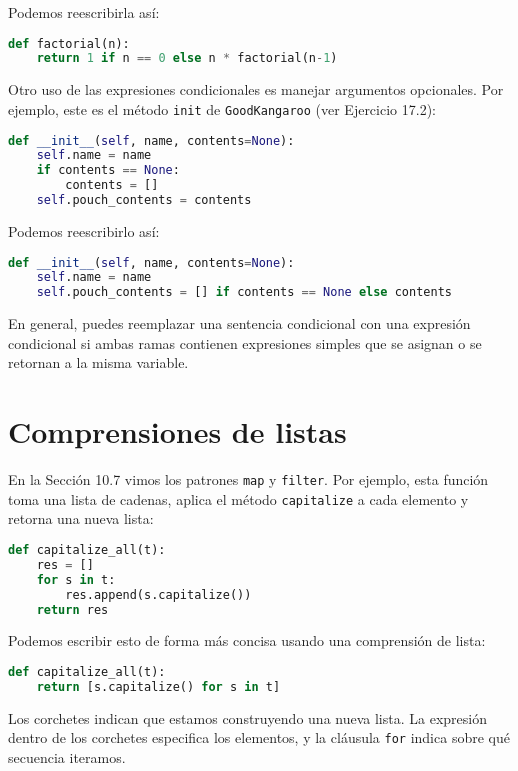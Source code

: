 Podemos reescribirla así:

\begin{lstlisting}[language=Python]
def factorial(n):
    return 1 if n == 0 else n * factorial(n-1)
\end{lstlisting}

Otro uso de las expresiones condicionales es manejar argumentos opcionales. Por ejemplo, este es el método \texttt{init} de \texttt{GoodKangaroo} (ver Ejercicio 17.2):

\begin{lstlisting}[language=Python]
def __init__(self, name, contents=None):
    self.name = name
    if contents == None:
        contents = []
    self.pouch_contents = contents
\end{lstlisting}

Podemos reescribirlo así:

\begin{lstlisting}[language=Python]
def __init__(self, name, contents=None):
    self.name = name
    self.pouch_contents = [] if contents == None else contents
\end{lstlisting}

En general, puedes reemplazar una sentencia condicional con una expresión condicional si ambas ramas contienen expresiones simples que se asignan o se retornan a la misma variable.

\section{Comprensiones de listas}

En la Sección 10.7 vimos los patrones \texttt{map} y \texttt{filter}. Por ejemplo, esta función toma una lista de cadenas, aplica el método \texttt{capitalize} a cada elemento y retorna una nueva lista:

\begin{lstlisting}[language=Python]
def capitalize_all(t):
    res = []
    for s in t:
        res.append(s.capitalize())
    return res
\end{lstlisting}

Podemos escribir esto de forma más concisa usando una comprensión de lista:

\begin{lstlisting}[language=Python]
def capitalize_all(t):
    return [s.capitalize() for s in t]
\end{lstlisting}

Los corchetes indican que estamos construyendo una nueva lista. La expresión dentro de los corchetes especifica los elementos, y la cláusula \texttt{for} indica sobre qué secuencia iteramos.

